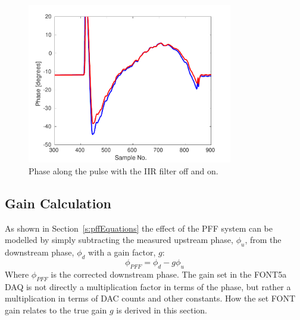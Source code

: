 \begin{figure}
  \centering
  \includegraphics[width=0.8\textwidth]{Figures/commissioning/iirPhaseFiltOffOn}
  \caption{Phase along the pulse with the IIR filter off and on.}
  \label{f:iirPhasefiltOffOn}
\end{figure}


\subsection{Gain Calculation}
\label{ss:fontGain}

As shown in Section~\ref{s:pffEquations} the effect of the PFF system can be modelled by simply subtracting the measured upstream phase, \(\phi_u\), from the downstream phase, \(\phi_d\) with a gain factor, \(g\):
\begin{equation} \label{e:realGainEqn}
\phi_{PFF} = \phi_d - g\phi_u
\end{equation}
Where \(\phi_{PFF}\) is the corrected downstream phase. The gain set in the FONT5a DAQ is not directly a multiplication factor in terms of the phase, but rather a multiplication in terms of DAC counts and other constants. How the set FONT gain relates to the true gain \(g\) is derived in this section.

